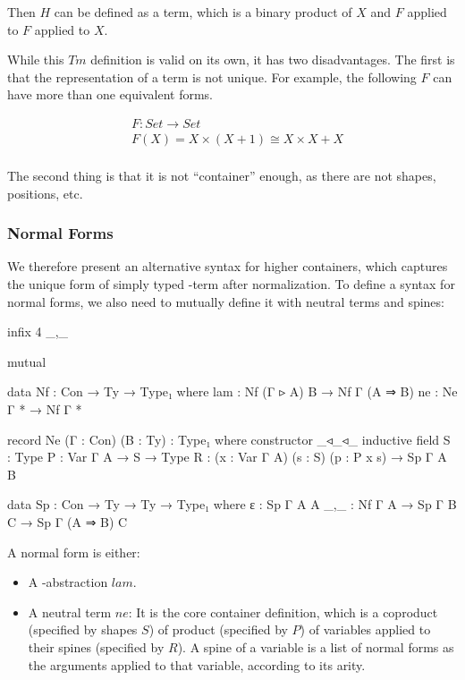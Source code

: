 Then $H$ can be defined as a term, which is a binary product of $X$ and $F$ applied to $F$ applied to $X$. \hyperref[Htm]{\faCog}

While this $Tm$ definition is valid on its own, it has two disadvantages. The first is that the representation of a term is not unique. For example, the following $F$ can have more than one equivalent forms.

\begin{align*}
& F : Set \to Set \\
& F (X) = X \times (X + 1) \cong X \times X + X \\
\end{align*}

The second thing is that it is not ``container'' enough, as there are not shapes, positions, etc.

\subsubsection*{Normal Forms}

We therefore present an alternative syntax for higher containers, which captures the unique form of simply typed \lambda-term after normalization. To define a syntax for normal forms, we also need to mutually define it with neutral terms and spines:

\begin{code}[hide]
infix 4 _,_

mutual
\end{code}

\begin{code}
  data Nf : Con → Ty → Type₁ where
    lam : Nf (Γ ▹ A) B → Nf Γ (A ⇒ B)
    ne  : Ne Γ * → Nf Γ *

  record Ne (Γ : Con) (B : Ty) : Type₁ where
    constructor _◃_◃_
    inductive
    field
      S : Type
      P : Var Γ A → S → Type
      R : (x : Var Γ A) (s : S) (p : P x s) → Sp Γ A B

  data Sp : Con → Ty → Ty → Type₁ where
    ε   : Sp Γ A A
    _,_ : Nf Γ A → Sp Γ B C → Sp Γ (A ⇒ B) C
\end{code}

A normal form is either:

\begin{itemize}
  \item{A \lambda-abstraction $lam$.}
  \item{A neutral term $ne$: It is the core container definition, which is a coproduct (specified by shapes $S$) of product (specified by $P$) of variables applied to their spines (specified by $R$). A spine of a variable is a list of normal forms as the arguments applied to that variable, according to its arity.}
\end{itemize}

